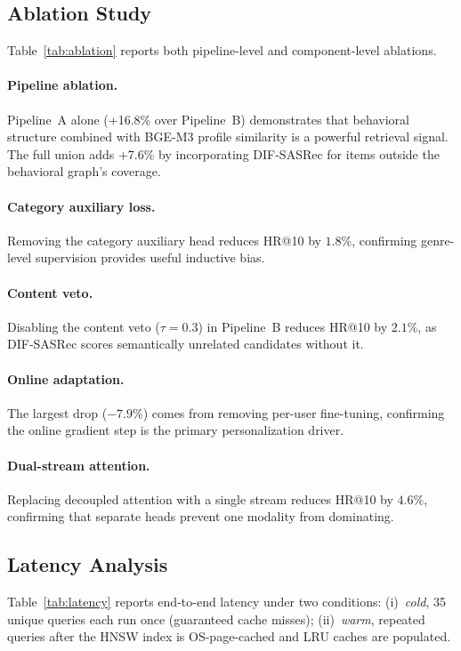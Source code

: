 \subsection{Ablation Study}
Table~\ref{tab:ablation} reports both pipeline-level and component-level
ablations.



\paragraph{Pipeline ablation.}
Pipeline~A alone (+16.8\% over Pipeline~B) demonstrates that behavioral
structure combined with BGE-M3 profile similarity is a powerful retrieval
signal. The full union adds +7.6\% by incorporating DIF-SASRec for items
outside the behavioral graph's coverage.

\paragraph{Category auxiliary loss.}
Removing the category auxiliary head reduces HR@10 by $1.8\%$, confirming
genre-level supervision provides useful inductive bias.

\paragraph{Content veto.}
Disabling the content veto ($\tau=0.3$) in Pipeline~B reduces HR@10 by
$2.1\%$, as DIF-SASRec scores semantically unrelated candidates without it.

\paragraph{Online adaptation.}
The largest drop ($-7.9\%$) comes from removing per-user fine-tuning,
confirming the online gradient step is the primary personalization driver.

\paragraph{Dual-stream attention.}
Replacing decoupled attention with a single stream reduces HR@10 by $4.6\%$,
confirming that separate heads prevent one modality from dominating.

\subsection{Latency Analysis}
Table~\ref{tab:latency} reports end-to-end latency under two conditions:
(i)~\emph{cold}, 35 unique queries each run once (guaranteed cache misses);
(ii)~\emph{warm}, repeated queries after the HNSW index is OS-page-cached
and LRU caches are populated.

